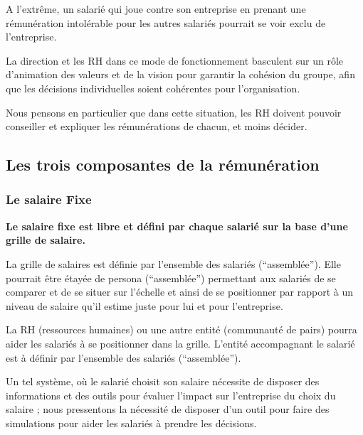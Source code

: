 \documentclass[12pt]{article}
\newcommand{\regle}[1]{%
  \begin{tcolorbox}[colframe=DarkOrange,boxrule=2pt,arc=4pt,left=6pt,right=6pt,top=6pt,bottom=6pt,boxsep=0pt,colback=LightOrange]
  \textbf{#1}
  \end{tcolorbox}
}
\begin{document}
 A l'extrême, un salarié qui joue contre son entreprise en prenant une rémunération intolérable pour les autres salariés pourrait se voir exclu de l’entreprise. 

 La direction et les RH dans ce mode de fonctionnement basculent sur un rôle d’animation des valeurs et de la vision pour garantir la cohésion du groupe, afin que les décisions individuelles soient cohérentes pour l’organisation. 
 
 Nous pensons en particulier que dans cette situation, les RH doivent pouvoir conseiller et expliquer les rémunérations de chacun, et moins décider.

\subsection{Les trois composantes de la rémunération}
\subsubsection{Le salaire Fixe}

 \regle{Le salaire fixe est libre et défini par chaque salarié sur la base d’une grille de salaire. }

 La grille de salaires est définie par l’ensemble des salariés (“assemblée”). Elle pourrait être étayée de persona  (“assemblée”) permettant aux salariés de se comparer et de se situer sur l’échelle et ainsi de se positionner par rapport à un niveau de salaire qu’il estime juste pour lui et pour l’entreprise. 

 La RH (ressources humaines) ou une autre entité (communauté de pairs) pourra aider les salariés à se positionner dans la grille. L'entité accompagnant le salarié est à définir par l'ensemble des salariés (“assemblée”).
 
 Un tel système, où le salarié choisit son salaire nécessite de disposer des informations et des outils pour évaluer l’impact sur l’entreprise du choix du salaire ; nous pressentons la nécessité de disposer d’un outil pour faire des simulations pour aider les salariés à prendre les décisions.
 
\end{document}

